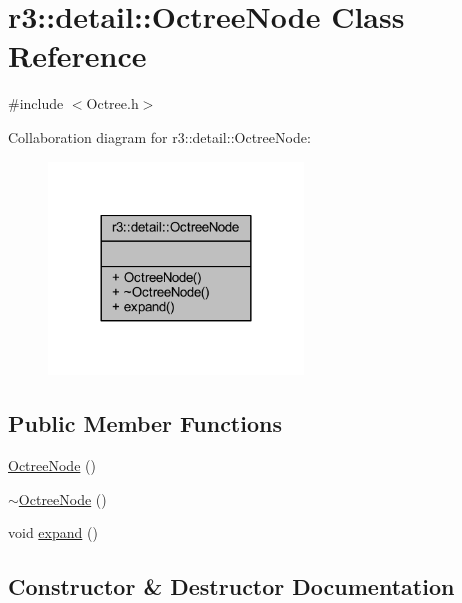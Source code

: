 \hypertarget{classr3_1_1detail_1_1_octree_node}{}\section{r3\+:\+:detail\+:\+:Octree\+Node Class Reference}
\label{classr3_1_1detail_1_1_octree_node}


{\ttfamily \#include $<$Octree.\+h$>$}



Collaboration diagram for r3\+:\+:detail\+:\+:Octree\+Node\+:\nopagebreak
\begin{figure}[H]
\begin{center}
\leavevmode
\includegraphics[width=192pt]{classr3_1_1detail_1_1_octree_node__coll__graph}
\end{center}
\end{figure}
\subsection*{Public Member Functions}
\begin{DoxyCompactItemize}
\item 
\mbox{\hyperlink{classr3_1_1detail_1_1_octree_node_ae89a72a75fabc0cd38003f03c750cd05}{Octree\+Node}} ()
\item 
\mbox{\hyperlink{classr3_1_1detail_1_1_octree_node_aad03f7781769d54ec136cd29d1444046}{$\sim$\+Octree\+Node}} ()
\item 
void \mbox{\hyperlink{classr3_1_1detail_1_1_octree_node_a7fed2d9ab9f17979add0276a4be6a2fe}{expand}} ()
\end{DoxyCompactItemize}


\subsection{Constructor \& Destructor Documentation}
\mbox{\label{classr3_1_1detail_1_1_octree_node_ae89a72a75fabc0cd38003f03c750cd05}} 
